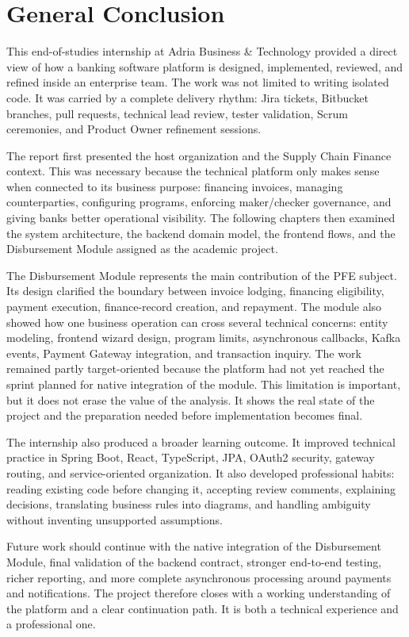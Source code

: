 \chapter*{General Conclusion}

This end-of-studies internship at Adria Business \& Technology provided a direct view of how a banking software platform is designed, implemented, reviewed, and refined inside an enterprise team. The work was not limited to writing isolated code. It was carried by a complete delivery rhythm: Jira tickets, Bitbucket branches, pull requests, technical lead review, tester validation, Scrum ceremonies, and Product Owner refinement sessions.

The report first presented the host organization and the Supply Chain Finance context. This was necessary because the technical platform only makes sense when connected to its business purpose: financing invoices, managing counterparties, configuring programs, enforcing maker/checker governance, and giving banks better operational visibility. The following chapters then examined the system architecture, the backend domain model, the frontend flows, and the Disbursement Module assigned as the academic project.

The Disbursement Module represents the main contribution of the PFE subject. Its design clarified the boundary between invoice lodging, financing eligibility, payment execution, finance-record creation, and repayment. The module also showed how one business operation can cross several technical concerns: entity modeling, frontend wizard design, program limits, asynchronous callbacks, Kafka events, Payment Gateway integration, and transaction inquiry. The work remained partly target-oriented because the platform had not yet reached the sprint planned for native integration of the module. This limitation is important, but it does not erase the value of the analysis. It shows the real state of the project and the preparation needed before implementation becomes final.

The internship also produced a broader learning outcome. It improved technical practice in Spring Boot, React, TypeScript, JPA, OAuth2 security, gateway routing, and service-oriented organization. It also developed professional habits: reading existing code before changing it, accepting review comments, explaining decisions, translating business rules into diagrams, and handling ambiguity without inventing unsupported assumptions.

Future work should continue with the native integration of the Disbursement Module, final validation of the backend contract, stronger end-to-end testing, richer reporting, and more complete asynchronous processing around payments and notifications. The project therefore closes with a working understanding of the platform and a clear continuation path. It is both a technical experience and a professional one.

